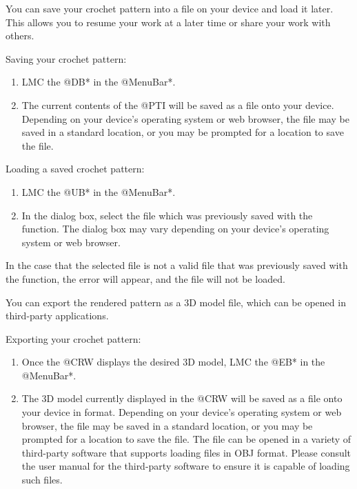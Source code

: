 \documentclass[main.tex]{subfiles}
\begin{document}
You can save your crochet pattern into a file on your device and load it later. This allows you to resume your work at a later time or share your work with others.

Saving your crochet pattern:
\begin{enumerate}
\item LMC the @DB* in the @MenuBar*.
\item The current contents of the @PTI will be saved as a file onto your device. Depending on your device's operating system or web browser, the file may be saved in a standard location, or you may be prompted for a location to save the file.
\end{enumerate}

Loading a saved crochet pattern:
\begin{enumerate}
\item LMC the @UB* in the @MenuBar*.
\item In the dialog box, select the file which was previously saved with the  function. The dialog box may vary depending on your device's operating system or web browser.
\end{enumerate}
In the case that the selected file is not a valid file that was previously saved with the  function, the error  will appear, and the file will not be loaded.

You can export the rendered pattern as a 3D model file, which can be opened in third-party applications.

Exporting your crochet pattern:
\begin{enumerate}
\item Once the @CRW displays the desired 3D model, LMC the @EB* in the @MenuBar*.
\item The 3D model currently displayed in the @CRW will be saved as a file onto your device in  format. Depending on your device's operating system or web browser, the file may be saved in a standard location, or you may be prompted for a location to save the file. The file can be opened in a variety of third-party software that supports loading files in OBJ format. Please consult the user manual for the third-party software to ensure it is capable of loading such files.
\end{enumerate}
\end{document}

